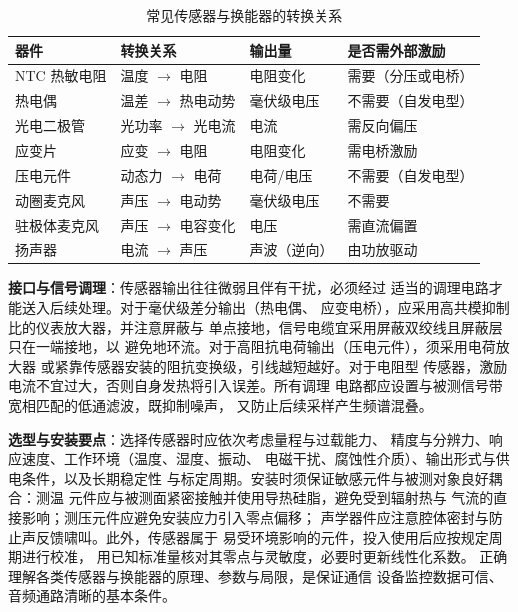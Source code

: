 \begin{table}[htbp]
\centering
\caption{常见传感器与换能器的转换关系}
\begin{tabular}{|p{2.6cm}|p{3.0cm}|p{2.6cm}|p{3.2cm}|}
\hline
\textbf{器件} & \textbf{转换关系} & \textbf{输出量} & \textbf{是否需外部激励} \\
\hline
NTC 热敏电阻 & 温度 $\rightarrow$ 电阻 & 电阻变化 & 需要（分压或电桥） \\
\hline
热电偶 & 温差 $\rightarrow$ 热电动势 & 毫伏级电压 & 不需要（自发电型） \\
\hline
光电二极管 & 光功率 $\rightarrow$ 光电流 & 电流 & 需反向偏压 \\
\hline
应变片 & 应变 $\rightarrow$ 电阻 & 电阻变化 & 需电桥激励 \\
\hline
压电元件 & 动态力 $\rightarrow$ 电荷 & 电荷/电压 & 不需要（自发电型） \\
\hline
动圈麦克风 & 声压 $\rightarrow$ 电动势 & 毫伏级电压 & 不需要 \\
\hline
驻极体麦克风 & 声压 $\rightarrow$ 电容变化 & 电压 & 需直流偏置 \\
\hline
扬声器 & 电流 $\rightarrow$ 声压 & 声波（逆向） & 由功放驱动 \\
\hline
\end{tabular}
\end{table}

\textbf{接口与信号调理}：传感器输出往往微弱且伴有干扰，必须经过
适当的调理电路才能送入后续处理。对于毫伏级差分输出（热电偶、
应变电桥），应采用高共模抑制比的仪表放大器，并注意屏蔽与
单点接地，信号电缆宜采用屏蔽双绞线且屏蔽层只在一端接地，以
避免地环流。对于高阻抗电荷输出（压电元件），须采用电荷放大器
或紧靠传感器安装的阻抗变换级，引线越短越好。对于电阻型
传感器，激励电流不宜过大，否则自身发热将引入误差。所有调理
电路都应设置与被测信号带宽相匹配的低通滤波，既抑制噪声，
又防止后续采样产生频谱混叠。

\textbf{选型与安装要点}：选择传感器时应依次考虑量程与过载能力、
精度与分辨力、响应速度、工作环境（温度、湿度、振动、
电磁干扰、腐蚀性介质）、输出形式与供电条件，以及长期稳定性
与标定周期。安装时须保证敏感元件与被测对象良好耦合：测温
元件应与被测面紧密接触并使用导热硅脂，避免受到辐射热与
气流的直接影响；测压元件应避免安装应力引入零点偏移；
声学器件应注意腔体密封与防止声反馈啸叫。此外，传感器属于
易受环境影响的元件，投入使用后应按规定周期进行校准，
用已知标准量核对其零点与灵敏度，必要时更新线性化系数。
正确理解各类传感器与换能器的原理、参数与局限，是保证通信
设备监控数据可信、音频通路清晰的基本条件。
